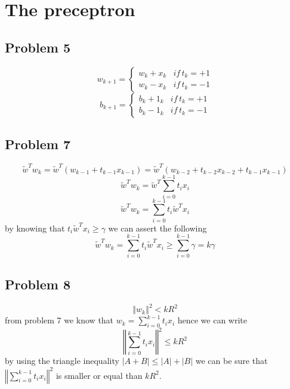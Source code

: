 \section{The preceptron}

\subsection*{Problem 5}
\[
w_{k+1}=\begin{cases}
w_{k}+x_{k} & if\, t_{k}=+1\\
w_{k}-x_{k} & if\, t_{k}=-1
\end{cases}
\]
\[
b_{k+1}=\begin{cases}
b_{k}+1_{k} & if\, t_{k}=+1\\
b_{k}-1_{k} & if\, t_{k}=-1
\end{cases}
\]


\subsection*{Problem 7}
\[
\tilde{w}^{T}w_{k}=\tilde{w}^{T}\left(w_{k-1}+t_{k-1}x_{k-1}\right)=\tilde{w}^{T}\left(w_{k-2}+t_{k-2}x_{k-2}+t_{k-1}x_{k-1}\right)
\]
\[
\tilde{w}^{T}w_{k}=\tilde{w}^{T}\sum_{i=0}^{k-1}t_{i}x_{i}
\]
\[
\tilde{w}^{T}w_{k}=\sum_{i=0}^{k-1}t_{i}\tilde{w}^{T}x_{i}
\]
by knowing that $t_{i}\tilde{w}^{T}x_{i}\geq \gamma$ we can assert
the following
\[
\tilde{w}^{T}w_{k}=\sum_{i=0}^{k-1}t_{i}\tilde{w}^{T}x_{i} \geq \sum_{i=0}^{k-1}\gamma = k\gamma
\]


\subsection*{Problem 8}
\[
\left\Vert w_{k}\right\Vert ^{2}<kR^{2}
\]
from problem 7 we know that $w_{k}=\sum_{i=0}^{k-1}t_{i}x_{i}$ hence
we can write 
\[
\left\Vert \sum_{i=0}^{k-1}t_{i}x_{i}\right\Vert ^{2} \leq kR^{2}
\]
by using the triangle inequality
$\left|A+B\right|\leq\left|A\right|+\left|B\right|$
we can be sure that $\left\Vert \sum_{i=0}^{k-1}t_{i}x_{i}\right\Vert ^{2}$
is smaller or equal than $kR^{2}$.



